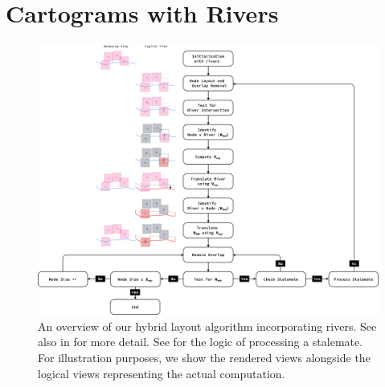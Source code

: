 \section{Cartograms with Rivers}
 {
  \begin{figure}[tb!]
      \centering
      \includegraphics[width=\textwidth,height=\textheight,keepaspectratio]{figure/flowchart.png}
      \caption{An overview of our hybrid layout algorithm incorporating rivers. See also  in  for more detail. See  for the logic of processing a stalemate. For illustration purposes, we show the rendered views alongside the logical views representing the actual computation.}
      \label{fig:flowchart}
  \end{figure}
 }

